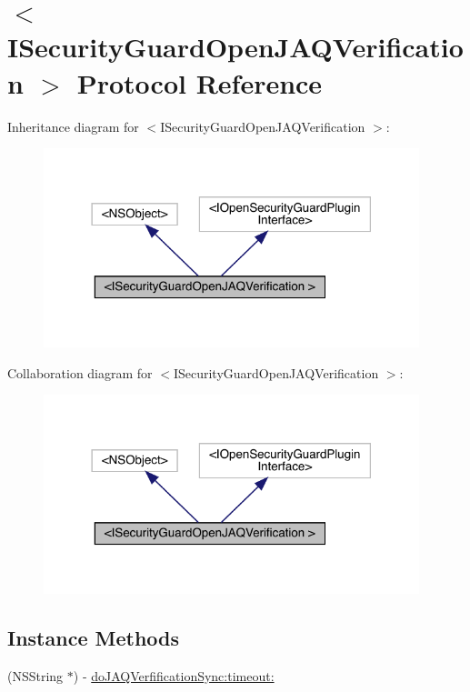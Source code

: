 \hypertarget{protocol_i_security_guard_open_j_a_q_verification_01-p}{}\section{$<$I\+Security\+Guard\+Open\+J\+A\+Q\+Verification $>$ Protocol Reference}
\label{protocol_i_security_guard_open_j_a_q_verification_01-p}


Inheritance diagram for $<$I\+Security\+Guard\+Open\+J\+A\+Q\+Verification $>$\+:\nopagebreak
\begin{figure}[H]
\begin{center}
\leavevmode
\includegraphics[width=310pt]{protocol_i_security_guard_open_j_a_q_verification_01-p__inherit__graph}
\end{center}
\end{figure}


Collaboration diagram for $<$I\+Security\+Guard\+Open\+J\+A\+Q\+Verification $>$\+:\nopagebreak
\begin{figure}[H]
\begin{center}
\leavevmode
\includegraphics[width=310pt]{protocol_i_security_guard_open_j_a_q_verification_01-p__coll__graph}
\end{center}
\end{figure}
\subsection*{Instance Methods}
\begin{DoxyCompactItemize}
\item 
(N\+S\+String $\ast$) -\/ \mbox{\hyperlink{protocol_i_security_guard_open_j_a_q_verification_01-p_a6b2631dc13624e88d53af589d28647d5}{do\+J\+A\+Q\+Verfification\+Sync\+:timeout\+:}}
\end{DoxyCompactItemize}


